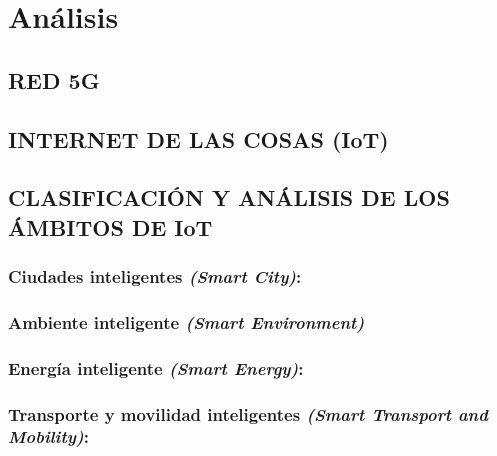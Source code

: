 
\chapter{Análisis} %

\label{Chapter4} %



\section{RED 5G}


\section{INTERNET DE LAS COSAS (IoT)}

\section{CLASIFICACIÓN Y ANÁLISIS DE LOS ÁMBITOS DE IoT}
\subsection{Ciudades inteligentes \textit{(Smart City)}:}
\subsection{Ambiente inteligente \textit{(Smart Environment)}}
\subsection{Energía inteligente \textit{(Smart Energy)}:}
\subsection{Transporte y movilidad inteligentes \textit{(Smart Transport and Mobility)}:}

